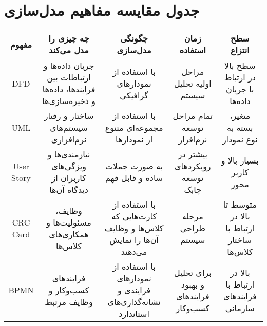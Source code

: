 \section*{جدول مقایسه مفاهیم مدل‌سازی}

\begin{tabular}{|c|c|c|c|c|}
	\hline
	مفهوم & چه چیزی را مدل می‌کند & چگونگی مدل‌سازی & زمان استفاده & سطح انتزاع \\ \hline
	DFD & جریان داده‌ها و ارتباطات بین فرایندها، داده‌ها و ذخیره‌سازی‌ها & با استفاده از نمودارهای گرافیکی & مراحل اولیه تحلیل سیستم & سطح بالا در ارتباط با جریان داده‌ها \\
	UML & ساختار و رفتار سیستم‌های نرم‌افزاری & با استفاده از مجموعه‌ای متنوع از نمودارها & تمام مراحل توسعه نرم‌افزار & متغیر، بسته به نوع نمودار \\
	User Story & نیازمندی‌ها و ویژگی‌های کاربران از دیدگاه آن‌ها & به صورت جملات ساده و قابل فهم & بیشتر در رویکردهای توسعه چابک & بسیار بالا و کاربر محور \\
	CRC Card & وظایف، مسئولیت‌ها و همکاری‌های کلاس‌ها & با استفاده از کارت‌هایی که کلاس‌ها و وظایف آن‌ها را نمایش می‌دهند & مرحله طراحی سیستم & متوسط تا بالا در ارتباط با ساختار کلاس‌ها \\
	BPMN & فرایندهای کسب‌وکار و وظایف مرتبط & با استفاده از نمودارهای فرایندی و نشانه‌گذاری‌های استاندارد & برای تحلیل و بهبود فرایندهای کسب‌وکار & بالا در ارتباط با فرایندهای سازمانی \\
	\hline
\end{tabular}